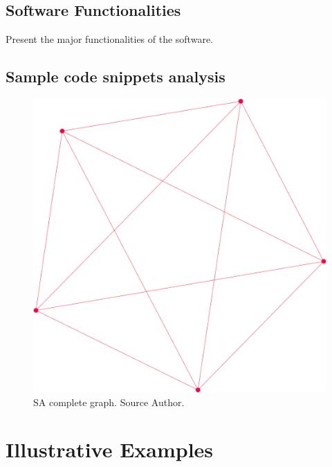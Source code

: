 \documentclass[preprint,12pt, a4paper]{elsarticle}
\begin{document}
\subsection{Software Functionalities}
\label{functionalities}

Present the major functionalities of the software.

\subsection{Sample code snippets analysis}
\label{code}

\begin{figure}[!htbp]
    \begin{center}
        \includegraphics[scale=0.2]{images/complete.png}
    \end{center}
    \caption{SA complete graph. Source Author.}
    \label{fig:complete}
\end{figure}

\section{Illustrative Examples}
\label{examples}
\end{document}
